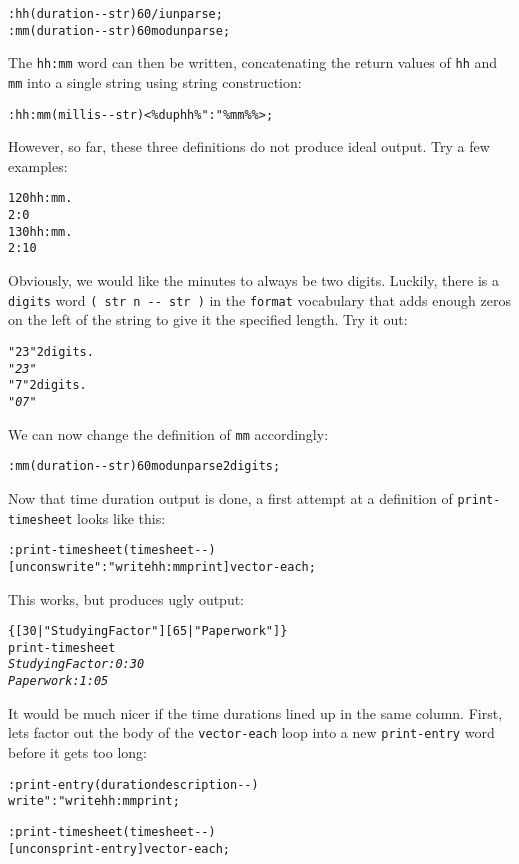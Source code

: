 \documentclass[english]{book}
\begin{document}
\begin{alltt}
: hh ( duration -{}- str ) 60 /i unparse ;
: mm ( duration -{}- str ) 60 mod unparse ;
\end{alltt}

The \texttt{hh:mm} word can then be written, concatenating the return
values of \texttt{hh} and \texttt{mm} into a single string using string
construction:

\begin{alltt}
: hh:mm ( millis -{}- str ) <\% dup hh \% ":" \% mm \% \%> ;
\end{alltt}
However, so far, these three definitions do not produce ideal output.
Try a few examples:

\begin{alltt}
120 hh:mm .
2:0
130 hh:mm .
2:10
\end{alltt}
Obviously, we would like the minutes to always be two digits. Luckily,
there is a \texttt{digits} word \texttt{( str n -{}- str )} in the
\texttt{format} vocabulary that adds enough zeros on the left of the
string to give it the specified length. Try it out:

\begin{alltt}
"23" 2 digits .
\emph{"23"}
"7"2 digits .
\emph{"07"}
\end{alltt}
We can now change the definition of \texttt{mm} accordingly:

\begin{alltt}
: mm ( duration -{}- str ) 60 mod unparse 2 digits ;
\end{alltt}
Now that time duration output is done, a first attempt at a definition
of \texttt{print-timesheet} looks like this:

\begin{alltt}
: print-timesheet ( timesheet -{}- )
    {[} uncons write ": " write hh:mm print {]} vector-each ;
\end{alltt}
This works, but produces ugly output:

\begin{alltt}
\{ {[} 30 | "Studying Factor" {]} {[} 65 | "Paperwork" {]} \}
print-timesheet
\emph{Studying Factor: 0:30}
\emph{Paperwork: 1:05}
\end{alltt}

It would be much nicer if the time durations lined up in the same
column. First, lets factor out the body of the \texttt{vector-each}
loop into a new \texttt{print-entry} word before it gets too long:

\begin{alltt}
: print-entry ( duration description -{}- )
    write ": " write hh:mm print ;

: print-timesheet ( timesheet -{}- )
    {[} uncons print-entry {]} vector-each ;
\end{alltt}
\end{document}
